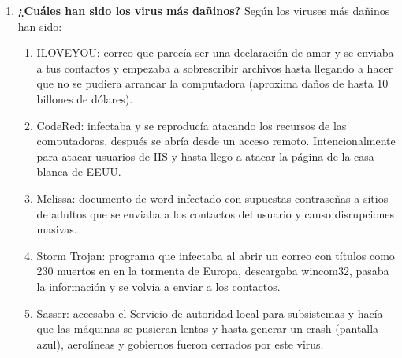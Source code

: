 \documentclass[stu, 12pt, letterpaper, donotrepeattitle, floatsintext, natbib, helv]{apa7}
\begin{document}
\begin{enumerate}
    \item \textbf{¿Cuáles han sido los virus más dañinos?}
    Según \cite{DangerousComputerViruses} los viruses más dañinos han sido:
    \begin{enumerate}
        \item ILOVEYOU: correo que parecía ser una declaración de amor y se enviaba a tus contactos y empezaba a sobrescribir archivos hasta llegando a hacer que no se pudiera arrancar la computadora (aproxima daños de hasta 10 billones de dólares).
        \item CodeRed: infectaba y se reproducía atacando los recursos de las computadoras, después se abría desde un acceso remoto. Intencionalmente para atacar usuarios de IIS y hasta llego a atacar la página de la casa blanca de EEUU.
        \item Melissa: documento de word infectado con supuestas contraseñas a sitios de adultos que se enviaba a los contactos del usuario y causo disrupciones masivas.
        \item Storm Trojan: programa que infectaba al abrir un correo con títulos como 230 muertos en en la tormenta de Europa, descargaba wincom32, pasaba la información y se volvía a enviar a los contactos.
        \item Sasser: accesaba el Servicio de autoridad local para subsistemas y hacía que las máquinas se pusieran lentas y hasta generar un crash (pantalla azul), aerolíneas y gobiernos fueron cerrados por este virus.
    \end{enumerate}
    

\end{enumerate}
\end{document}
